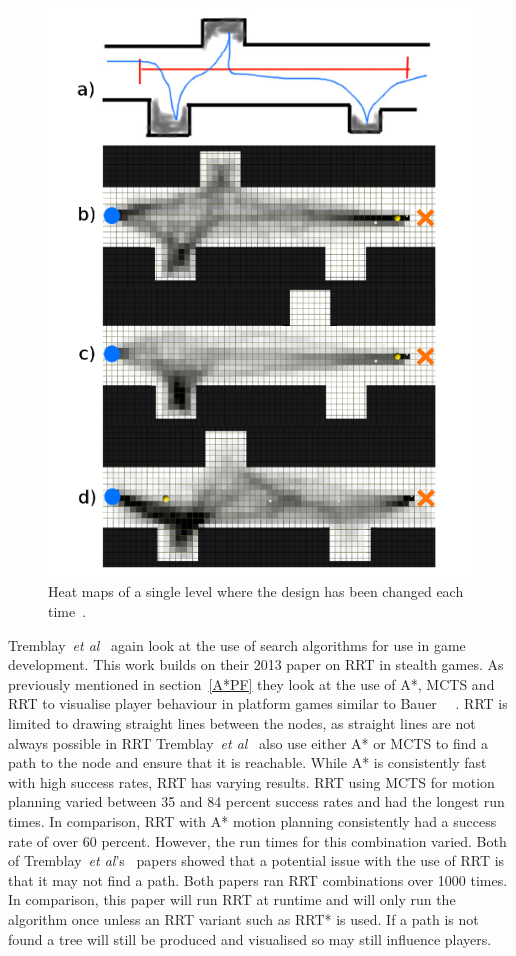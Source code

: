\documentclass[journal]{IEEEtran}
\begin{document}
	\begin{figure}[h]
		\includegraphics[width=1.0\linewidth]{TremblayHeatMap.png}
		\caption{Heat maps of a single level where the design has been changed each time~\cite{Tremblay2013}.}
		\label{TremblayHeatMap}
	\end{figure} 
	
	Tremblay~\textit{et al}~\cite{Tremblay2014} again look at the use of search algorithms for use in game development. This work builds on their 2013 paper on RRT in stealth games. As previously mentioned in section~\ref{A*PF} they look at the use of A*, MCTS and RRT to visualise player behaviour in platform games similar to Bauer ~\cite{Tremblay2014}~\cite{bauer2012}.  RRT is limited to drawing straight lines between the nodes, as straight lines are not always possible in RRT Tremblay~\textit{et al}~\cite{Tremblay2014} also use either A* or MCTS to find a path to the node and ensure that it is reachable.
	While A* is consistently fast with high success rates, RRT has varying results. RRT using MCTS for motion planning varied between 35 and 84 percent success rates and had the longest run times. In comparison, RRT with A* motion planning consistently had a success rate of over 60 percent. However, the run times for this combination varied. 
	Both of Tremblay~\textit{et al}'s~\cite{Tremblay2014, Tremblay2013} papers showed that a potential issue with the use of RRT is that it may not find a path. Both papers ran RRT combinations over 1000 times. In comparison, this paper will run RRT at runtime and will only run the algorithm once unless an RRT variant such as RRT* is used. If a path is not found a tree will still be produced and visualised so may still influence players.
	
\end{document}
